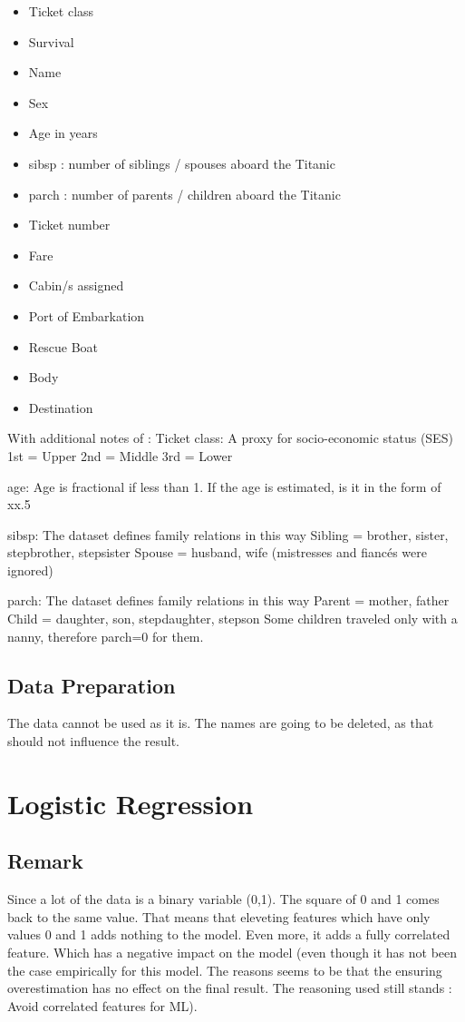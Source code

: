 \documentclass{article}
\begin{document}
\begin{itemize}
\item Ticket class
\item Survival 
\item Name
\item Sex
\item Age in years
\item sibsp : number of siblings / spouses aboard the Titanic
\item parch : number of parents / children aboard the Titanic
\item Ticket number	
\item Fare
\item Cabin/s assigned
\item Port of Embarkation	
\item Rescue Boat
\item Body
\item Destination
\end{itemize}

With additional notes of :
Ticket class: A proxy for socio-economic status (SES)
1st = Upper
2nd = Middle
3rd = Lower

age: Age is fractional if less than 1. If the age is estimated, is it in the form of xx.5

sibsp: The dataset defines family relations in this way
Sibling = brother, sister, stepbrother, stepsister
Spouse = husband, wife (mistresses and fiancés were ignored)

parch: The dataset defines family relations in this way
Parent = mother, father
Child = daughter, son, stepdaughter, stepson
Some children traveled only with a nanny, therefore parch=0 for them.



\subsection{Data Preparation}
The data cannot be used as it is.
The names are going to be deleted, as that should not influence the result.

\section{Logistic Regression}
\subsection{Remark}

Since a lot of the data is a binary variable (0,1). The square of 0 and 1 comes back to the same value. That means that eleveting features which have only values 0 and 1 adds nothing to the model. Even more, it adds a fully correlated feature. Which has a negative impact on the model (even though it has not been the case empirically for this model. The reasons seems to be that the ensuring overestimation has no effect on the final result. The reasoning used still stands : Avoid correlated features for ML).
\\
\end{document}
